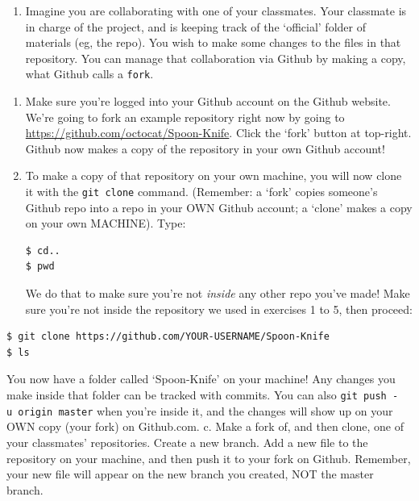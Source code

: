 \documentclass[english,]{book}
\providecommand{\tightlist}{%
  \setlength{\itemsep}{0pt}\setlength{\parskip}{0pt}}
\begin{document}
\begin{enumerate}
\def\labelenumi{\arabic{enumi}.}
\setcounter{enumi}{5}
\tightlist
\item
  Imagine you are collaborating with one of your classmates. Your
  classmate is in charge of the project, and is keeping track of the
  `official' folder of materials (eg, the repo). You wish to make some
  changes to the files in that repository. You can manage that
  collaboration via Github by making a copy, what Github calls a
  \texttt{fork}.
\end{enumerate}

\begin{enumerate}
\def\labelenumi{\alph{enumi}.}
\item
  Make sure you're logged into your Github account on the Github
  website. We're going to fork an example repository right now by going
  to \url{https://github.com/octocat/Spoon-Knife}. Click the `fork'
  button at top-right. Github now makes a copy of the repository in your
  own Github account!
\item
  To make a copy of that repository on your own machine, you will now
  clone it with the \texttt{git\ clone} command. (Remember: a `fork'
  copies someone's Github repo into a repo in your OWN Github account; a
  `clone' makes a copy on your own MACHINE). Type:

\begin{verbatim}
$ cd.. 
$ pwd
\end{verbatim}

  We do that to make sure you're not \emph{inside} any other repo you've
  made! Make sure you're not inside the repository we used in exercises
  1 to 5, then proceed:
\end{enumerate}

\begin{verbatim}
$ git clone https://github.com/YOUR-USERNAME/Spoon-Knife
$ ls
\end{verbatim}

You now have a folder called `Spoon-Knife' on your machine! Any changes
you make inside that folder can be tracked with commits. You can also
\texttt{git\ push\ -u\ origin\ master} when you're inside it, and the
changes will show up on your OWN copy (your fork) on Github.com. c. Make
a fork of, and then clone, one of your classmates' repositories. Create
a new branch. Add a new file to the repository on your machine, and then
push it to your fork on Github. Remember, your new file will appear on
the new branch you created, NOT the master branch.
\end{document}
